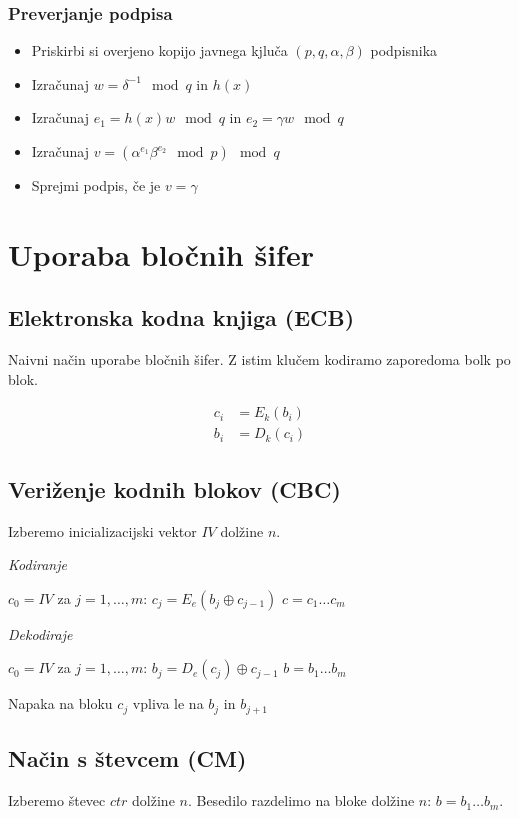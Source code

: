 \begin{multicols}{5}
\subsubsection*{Preverjanje podpisa}
\begin{itemize}
	\item Priskirbi si overjeno kopijo javnega kjluča $(p,q,\alpha,\beta)$ podpisnika
	\item Izračunaj $w = \delta^{-1} \mod q$ in $h(x)$
	\item Izračunaj $e_1 = h(x)w \mod q$ in $e_2 = \gamma w \mod q$
	\item Izračunaj $v = (\alpha^{e_1} \beta^{e_2} \mod p ) \mod q $
	\item Sprejmi podpis, če je $v = \gamma$
\end{itemize}


\section*{Uporaba bločnih šifer}
\subsection*{Elektronska kodna knjiga (ECB)}
Naivni način uporabe bločnih šifer. Z istim klučem kodiramo zaporedoma bolk po blok.

\begin{align*}
	c_i &= E_k(b_i) \\
	b_i &= D_k(c_i)
\end{align*}

\subsection*{Veriženje kodnih blokov (CBC)}
Izberemo inicializacijski vektor $IV$ dolžine $n$.

\textit{Kodiranje}
\begin{koda}
$c_0 = IV$
za $j = 1, \dots, m$:
	$c_j = E_e(b_j \oplus c_{j-1})$
$c = c_1  \dots c_m$
\end{koda}

\textit{Dekodiraje}
\begin{koda}
$c_0 = IV$
za $j = 1, \dots, m$:
	$b_j = D_e(c_j) \oplus c_{j-1}$
$b = b_1  \dots b_m$
\end{koda}

Napaka na bloku $c_j$ vpliva le na $b_j$ in $b_{j+1}$

\subsection*{Način s števcem (CM)}
Izberemo števec $ctr$ dolžine $n$. Besedilo razdelimo na bloke dolžine $n$: $b = b_1 \dots b_m$.


\end{multicols}
